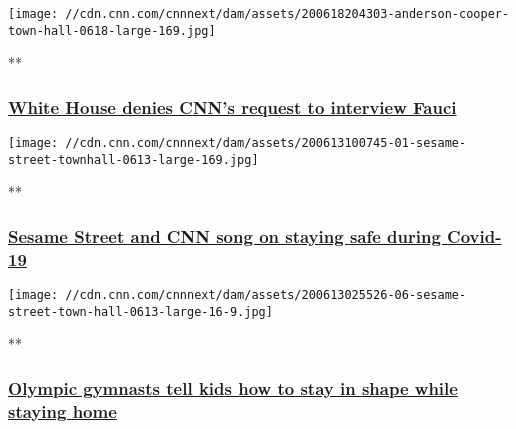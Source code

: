 \href{/videos/health/2020/06/19/coronavirus-town-hall-cooper-fauci-invitation-vpx.cnn/video/playlists/cnn-coronavirus-town-hall/}{}

\texttt{[image: //cdn.cnn.com/cnnnext/dam/assets/200618204303-anderson-cooper-town-hall-0618-large-169.jpg]}

**

\hypertarget{white-house-denies-cnns-request-to-interview-fauci}{%
\subsubsection{\texorpdfstring{\href{/videos/health/2020/06/19/coronavirus-town-hall-cooper-fauci-invitation-vpx.cnn/video/playlists/cnn-coronavirus-town-hall/}{White
House denies CNN's request to interview
Fauci}}{White House denies CNN's request to interview Fauci}}\label{white-house-denies-cnns-request-to-interview-fauci}}

\href{/videos/health/2020/06/13/sesame-street-cnn-coronavirus-town-hall-opening-song-vpx.cnn/video/playlists/cnn-coronavirus-town-hall/}{}

\texttt{[image: //cdn.cnn.com/cnnnext/dam/assets/200613100745-01-sesame-street-townhall-0613-large-169.jpg]}

**

\hypertarget{sesame-street-and-cnn-song-on-staying-safe-during-covid-19}{%
\subsubsection{\texorpdfstring{\href{/videos/health/2020/06/13/sesame-street-cnn-coronavirus-town-hall-opening-song-vpx.cnn/video/playlists/cnn-coronavirus-town-hall/}{Sesame
Street and CNN song on staying safe during
Covid-19}}{Sesame Street and CNN song on staying safe during Covid-19}}\label{sesame-street-and-cnn-song-on-staying-safe-during-covid-19}}

\href{/videos/health/2020/06/13/simone-biles-laurie-hernandez-sesame-street-coronavirus-town-hall-vpx.cnn/video/playlists/cnn-coronavirus-town-hall/}{}

\texttt{[image: //cdn.cnn.com/cnnnext/dam/assets/200613025526-06-sesame-street-town-hall-0613-large-16-9.jpg]}

**

\hypertarget{olympic-gymnasts-tell-kids-how-to-stay-in-shape-while-staying-home}{%
\subsubsection{\texorpdfstring{\href{/videos/health/2020/06/13/simone-biles-laurie-hernandez-sesame-street-coronavirus-town-hall-vpx.cnn/video/playlists/cnn-coronavirus-town-hall/}{Olympic
gymnasts tell kids how to stay in shape while staying
home}}{Olympic gymnasts tell kids how to stay in shape while staying home}}\label{olympic-gymnasts-tell-kids-how-to-stay-in-shape-while-staying-home}}


